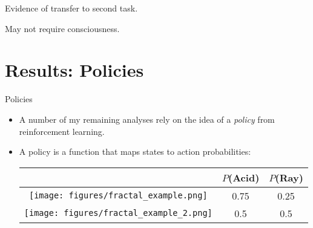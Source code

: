 \documentclass{beamer}
\begin{document}
\begin{frame}[standout]
Evidence of transfer to second task. \par
{} {
May not require consciousness.
}
\end{frame}

\section{Results: Policies}

\begin{frame}{Policies}
\begin{itemize}
\item A number of my remaining analyses rely on the idea of a \emph{policy} from reinforcement learning.
\item<2-> A policy is a function that maps states to action probabilities:
\begin{center}
\begin{table}

\begin{tabular}{|c|c|c|}
\hline 
& \(P\)(Acid) & \(P\)(Ray) \\
\hline
\texttt{[image: figures/fractal\_example.png]} & 0.75 & 0.25\\ \hline
\texttt{[image: figures/fractal\_example\_2.png]} & 0.5 & 0.5 \\ \hline
\end{tabular}
\end{table}
\end{center}
\end{itemize}
\end{frame}
\end{document}

